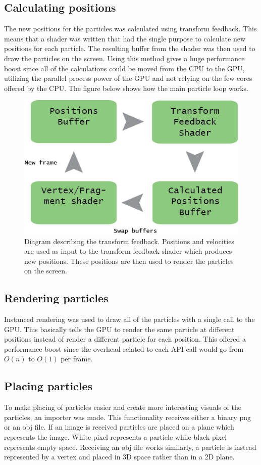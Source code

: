 \documentclass[report]{vgtc}
\begin{document}
\subsection{Calculating positions}
The new positions for the particles was calculated using transform feedback. This means that a shader was written that had the single purpose to calculate new positions for each particle. The resulting buffer from the shader was then used to draw the particles on the screen. Using this method gives a huge performance boost since all of the calculations could be moved from the CPU to the GPU, utilizing the parallel process power of the GPU and not relying on the few cores offered by the CPU.  The figure below shows how the main particle loop works.
\begin{figure}[H]
\includegraphics[scale=0.47]{img/transform.png}
\caption{Diagram describing the transform feedback. Positions and velocities are used as input to the transform feedback shader which produces new positions. These positions are then used to render the particles on the screen. }
\end{figure}

\subsection{Rendering particles}
Instanced rendering was used to draw all of the particles with a single call to the GPU. This basically tells the GPU to render the same particle at different positions instead of render a different particle for each position. This offered a performance boost since the overhead related to each API call would go from \(O(n)\) to \(O(1)\) per frame.


\subsection{Placing particles}
To make placing of particles easier and create more interesting visuals of the particles, an importer was made. This functionality receives either a binary png or an obj file. If an image is received particles are placed on a plane which represents the image. White pixel represents a particle while black pixel represents empty space. 
Receiving an obj file works similarly, a particle is instead represented by a vertex and placed in 3D space rather than in a 2D plane.
\end{document}
